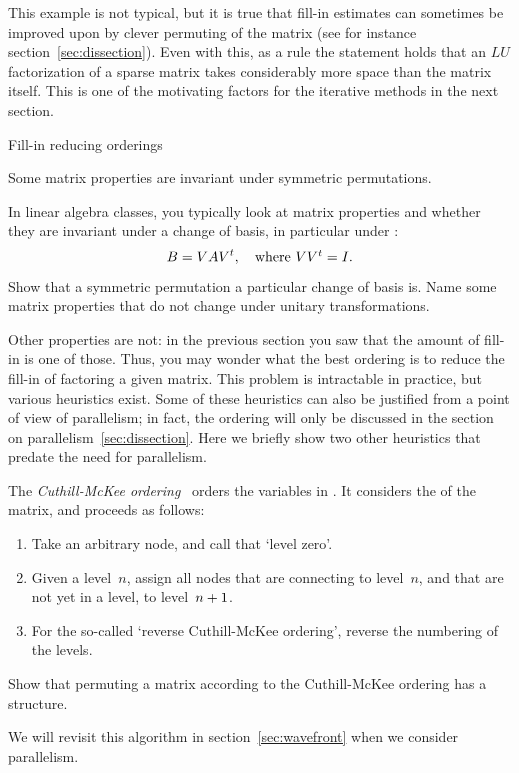 This example is not typical, but it is true that fill-in
estimates can sometimes be improved upon by clever permuting
of the matrix (see for instance section~\ref{sec:dissection}).
Even with this, as a rule
the statement holds that an $LU$ factorization of a sparse
matrix takes considerably more space than the matrix itself. This is
one of the motivating factors for the iterative methods in the next
section.

 {Fill-in reducing orderings}
\label{sec:fill-ordering}

Some matrix properties are invariant under symmetric permutations.
\begin{exercise}
  In linear algebra classes, you typically look at matrix properties
  and whether they are invariant under a change of basis, in
  particular under :
  \[ B = VAV^t,\quad\hbox{where $VV^t=I$.} \]
  Show that a
  symmetric permutation a particular change of basis is. Name some
  matrix properties that do not change under unitary transformations.
\end{exercise}
Other properties are not: in the previous section you saw that the
amount of fill-in is one of those. Thus, you may wonder what the best
ordering is to reduce the fill-in of factoring a given matrix. This
problem is intractable in practice, but various heuristics exist. Some
of these heuristics can also be justified from a point of view of
parallelism; in fact, the
 ordering will only be discussed in the
section on parallelism~\ref{sec:dissection}.
Here we briefly show two other heuristics that predate the
need for parallelism.

The \emph{Cuthill-McKee ordering}~\cite{CuMcK:reducing} orders
the variables in . It considers the
 of the matrix, and proceeds as
follows:
\begin{enumerate}
\item Take an arbitrary node, and call that `level zero'.
\item Given a level~$n$, assign all nodes that are connecting to
  level~$n$, and that are not yet in a level, to
  level~$n+\nobreak1$.
\item For the so-called `reverse Cuthill-McKee ordering', reverse the
  numbering of the levels.
\end{enumerate}
\begin{exercise}
  Show that permuting a matrix according to the Cuthill-McKee ordering
  has a  structure.
\end{exercise}
We will revisit this algorithm in section~\ref{sec:wavefront} when we
consider parallelism.

